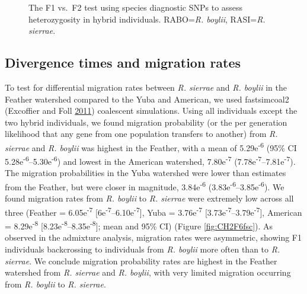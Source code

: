 \documentclass[proquest,12pt,final]{ucthesis-CA2012} %
\begin{document}
\begin{ucmainmatter}
\begin{figure}
{}

\caption{The F1 vs.~F2 test using species diagnostic SNPs to
assess heterozygosity in hybrid individuals. RABO=\emph{R. boylii},
RASI=\emph{R. sierrae}.}\label{fig:CH2F5gentest}
\end{figure}
\clearpage

\hypertarget{divergence-times-and-migration-rates}{%
\subsection{Divergence times and migration
rates}\label{divergence-times-and-migration-rates}}

To test for differential migration rates between \emph{R. sierrae} and
\emph{R. boylii} in the Feather watershed compared to the Yuba and
American, we used fastsimcoal2 (Excoffier and Foll
\protect\hyperlink{ref-excoffier_fastsimcoal_2011}{2011}) coalescent
simulations. Using all individuals except the two hybrid individuals, we
found migration probability (or the per generation likelihood that any
gene from one population transfers to another) from \emph{R. sierrae}
and \emph{R. boylii} was highest in the Feather, with a mean of
5.29e\textsuperscript{-6} (95\% CI
5.28e\textsuperscript{-6}--5.30e\textsuperscript{-6}) and lowest in the
American watershed, 7.80e\textsuperscript{-7}
(7.78e\textsuperscript{-7}--7.81e\textsuperscript{-7}). The migration
probabilities in the Yuba watershed were lower than estimates from the
Feather, but were closer in magnitude, 3.84e\textsuperscript{-6}
(3.83e\textsuperscript{-6}--3.85e\textsuperscript{-6}). We found
migration rates from \emph{R. boylii} to \emph{R. sierrae} were
extremely low across all three (Feather = 6.05e\textsuperscript{-7}
{[}6e\textsuperscript{-7}--6.10e\textsuperscript{-7}{]}, Yuba =
3.76e\textsuperscript{-7}
{[}3.73e\textsuperscript{-7}--3.79e\textsuperscript{-7}{]}, American =
8.29e\textsuperscript{-8}
{[}8.23e\textsuperscript{-8}--8.35e\textsuperscript{-8}{]}; mean and
95\% CI) (Figure \ref{fig:CH2F6fsc}). As observed in the admixture
analysis, migration rates were asymmetric, showing F1 individuals
backcrossing to individuals from \emph{R. boylii} more often than to
\emph{R. sierrae}. We conclude migration probability rates are highest
in the Feather watershed from \emph{R. sierrae} and \emph{R. boylii},
with very limited migration occurring from \emph{R. boylii} to \emph{R.
sierrae}.





\begin{figure}


\end{figure}
\end{ucmainmatter}
\end{document}
